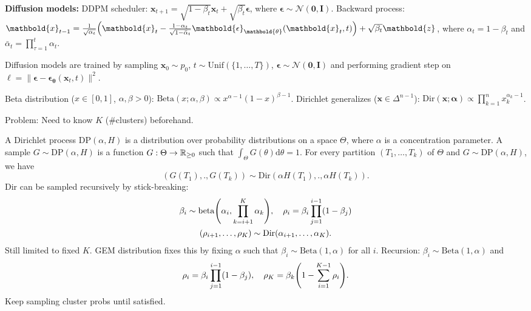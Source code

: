 \documentclass[9pt]{extarticle}
\newenvironment{topic}[1]
{\textbf{\sffamily \colorbox{black}{\rlap{\textbf{\textcolor{white}{#1}}}\hspace{\linewidth}\hspace{-2\fboxsep}}}}
{}
\newenvironment{subtopic}[1]
{\textbf{\sffamily #1:}}
{}
\renewcommand{\mat}[1]{\ensuremath{\mathbf{#1}}}
\renewcommand{\vec}[1]{\ensuremath{\mathbold{#1}}}
\begin{document}
\begin{multicols*}{3}
\begin{topic}{Stable diffusion}
\begin{subtopic}{Diffusion models}
            DDPM scheduler: $\vec{x}_{t+1} = \sqrt{1-\beta_t} \vec{x}_t + \sqrt{\beta_t} \vec{\epsilon}$, where
            $\vec{\epsilon} \sim \mathcal{N}(\vec{0}, \mat{I})$. Backward process: $\vec{x}_{t-1} =
                \frac{1}{\sqrt{\alpha_t}} \lft( \vec{x}_t - \frac{1-\alpha_t}{\sqrt{1-\bar{\alpha}_t}}
                \vec{\epsilon}_{\vec{\theta}}(\vec{x}_t, t) \rgt) + \sqrt{\beta_t} \vec{z}$, where $\alpha_t =
                1-\beta_t$ and $\bar{\alpha}_t = \prod_{\tau=1}^t \alpha_t$.

            Diffusion models are trained by sampling $\vec{x}_0 \sim p_0$, $t \sim \mathrm{Unif}(\{ 1, \ldots,
                T \})$, $\vec{\epsilon} \sim \mathcal{N}(\vec{0}, \mat{I})$ and performing gradient step on $\ell =
                \| \vec{\epsilon} - \vec{\epsilon}_{\vec{\theta}}(\vec{x}_t, t) \|^2$.
        \end{subtopic}

    \end{topic}

    \begin{topic}{Non-parametric Bayesian methods}
        Beta distribution ($x \in [0,1]$, $\alpha,\beta > 0$): $\mathrm{Beta}(x; \alpha, \beta) \propto
            x^{\alpha-1} (1-x)^{\beta-1}$. Dirichlet generalizes ($\vec{x} \in \Delta^{n-1}$):
        $\mathrm{Dir}(\vec{x}; \vec{\alpha}) \propto \prod_{k=1}^n x_k^{\alpha_k - 1}$.

        Problem: Need to know $K$ (\#clusters) beforehand.

        A Dirichlet process $\mathrm{DP}(\alpha, H)$ is a distribution over probability distributions on a
        space $\Theta$, where $\alpha$ is a concentration parameter. A sample $G \sim \mathrm{DP}(\alpha,
            H)$ is a function $G: \Theta \to \mathbb{R}_{\geq 0}$ such that $\int_{\Theta} G(\theta)\mathrm{d}\theta =
            1$. For every partition $(T_1, \ldots, T_k)$ of $\Theta$ and $G \sim \mathrm{DP}(\alpha, H)$, we
        have \[
            (G(T_1), ., G(T_k)) \sim \mathrm{Dir}(\alpha H(T_1), ., \alpha H(T_k)).
        \]
        Dir can be sampled recursively by stick-breaking:
        \begin{gather*}
            \beta_i \sim \mathrm{beta}\lft( \alpha_i, \prod_{k=i+1}^K \alpha_k \rgt), \quad \rho_i = \beta_i \prod_{j=1}^{i-1} (1-\beta_j) \\
            (\rho_{i+1}, \ldots, \rho_K) \sim \mathrm{Dir}(\alpha_{i+1}, \ldots, \alpha_K).
        \end{gather*}
        Still limited to fixed $K$. GEM distribution fixes this by fixing $\alpha$ such that
        $\beta_i \sim \mathrm{Beta}(1, \alpha)$ for all $i$. Recursion: $\beta_i \sim \mathrm{Beta}(1, \alpha)$ and \[
            \rho_i = \beta_i \prod_{j=1}^{i-1} (1-\beta_j), \quad \rho_K = \beta_k \lft( 1- \sum_{i=1}^{K-1} \rho_i \rgt).
        \]
        Keep sampling cluster probs until satisfied.


\end{topic}
\end{multicols*}
\end{document}

